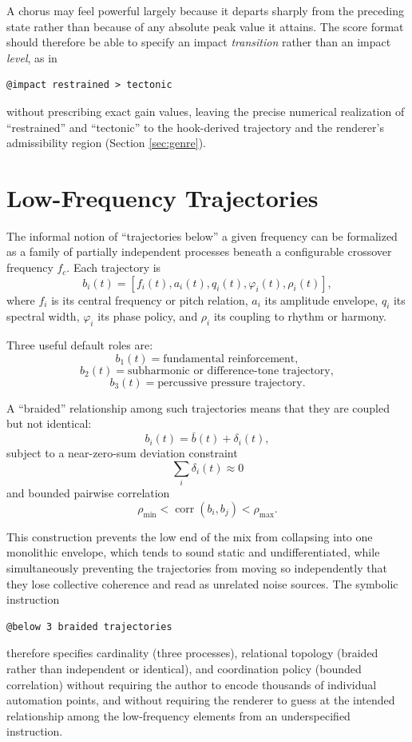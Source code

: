 \documentclass[11pt]{article}
\DeclareMathOperator{\corr}{corr}
\begin{document}
A chorus may feel powerful largely because it departs sharply from the preceding state rather than because of any absolute peak value it attains. The score format should therefore be able to specify an impact \emph{transition} rather than an impact \emph{level}, as in
\begin{Verbatim}[frame=single,fontsize=\small]
@impact restrained > tectonic
\end{Verbatim}
without prescribing exact gain values, leaving the precise numerical realization of ``restrained'' and ``tectonic'' to the hook-derived trajectory and the renderer's admissibility region (Section \ref{sec:genre}).

\section{Low-Frequency Trajectories}
\label{sec:lowfreq}

The informal notion of ``trajectories below'' a given frequency can be formalized as a family of partially independent processes beneath a configurable crossover frequency $f_c$. Each trajectory is
\[
b_i(t)=
[
f_i(t),a_i(t),q_i(t),\varphi_i(t),\rho_i(t)
],
\]
where $f_i$ is its central frequency or pitch relation, $a_i$ its amplitude envelope, $q_i$ its spectral width, $\varphi_i$ its phase policy, and $\rho_i$ its coupling to rhythm or harmony.

Three useful default roles are:
\[
b_1(t)=\text{fundamental reinforcement},
\]
\[
b_2(t)=\text{subharmonic or difference-tone trajectory},
\]
\[
b_3(t)=\text{percussive pressure trajectory}.
\]

A ``braided'' relationship among such trajectories means that they are coupled but not identical:
\[
b_i(t)=\bar{b}(t)+\delta_i(t),
\]
subject to a near-zero-sum deviation constraint
\[
\sum_i \delta_i(t)\approx0
\]
and bounded pairwise correlation
\[
\rho_{\min}
<
\corr(b_i,b_j)
<
\rho_{\max}.
\]

This construction prevents the low end of the mix from collapsing into one monolithic envelope, which tends to sound static and undifferentiated, while simultaneously preventing the trajectories from moving so independently that they lose collective coherence and read as unrelated noise sources. The symbolic instruction
\begin{Verbatim}[frame=single,fontsize=\small]
@below 3 braided trajectories
\end{Verbatim}
therefore specifies cardinality (three processes), relational topology (braided rather than independent or identical), and coordination policy (bounded correlation) without requiring the author to encode thousands of individual automation points, and without requiring the renderer to guess at the intended relationship among the low-frequency elements from an underspecified instruction.
\end{document}
